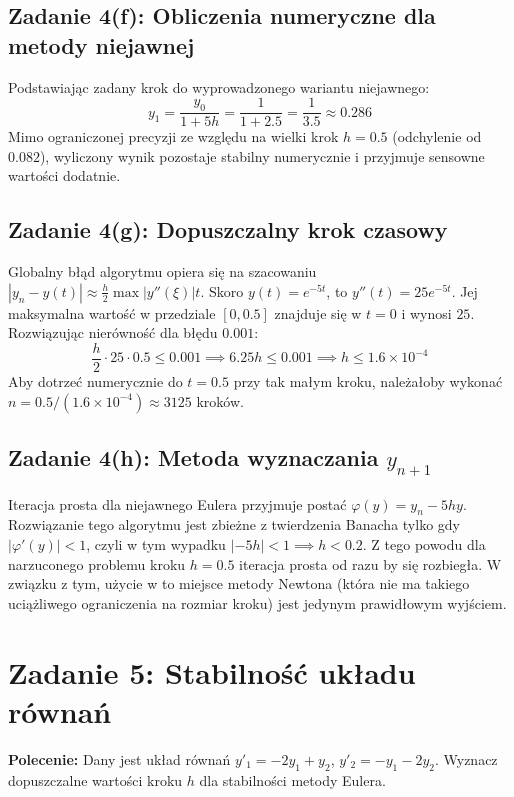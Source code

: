 \documentclass[12pt, a4paper]{article}
\begin{document}
\subsection{Zadanie 4(f): Obliczenia numeryczne dla metody niejawnej}
Podstawiając zadany krok do wyprowadzonego wariantu niejawnego:
\[
  y_1 = \frac{y_0}{1+5h} = \frac{1}{1+2.5} = \frac{1}{3.5} \approx 0.286
\]
Mimo ograniczonej precyzji ze względu na wielki krok $h=0.5$ (odchylenie od $0.082$), wyliczony wynik pozostaje stabilny numerycznie i przyjmuje sensowne wartości dodatnie.

\subsection{Zadanie 4(g): Dopuszczalny krok czasowy}
Globalny błąd algorytmu opiera się na szacowaniu $|y_n - y(t)| \approx \frac{h}{2} \max |y''(\xi)| t$. Skoro $y(t) = e^{-5t}$, to $y''(t) = 25e^{-5t}$. Jej maksymalna wartość w przedziale $[0, 0.5]$ znajduje się w $t=0$ i wynosi $25$. Rozwiązując nierówność dla błędu $0.001$:
\[
  \frac{h}{2} \cdot 25 \cdot 0.5 \leq 0.001 \implies 6.25h \leq 0.001 \implies h \leq 1.6 \times 10^{-4}
\]
Aby dotrzeć numerycznie do $t=0.5$ przy tak małym kroku, należałoby wykonać $n = 0.5 / (1.6 \times 10^{-4}) \approx 3125$ kroków.

\subsection{Zadanie 4(h): Metoda wyznaczania $y_{n+1}$}
Iteracja prosta dla niejawnego Eulera przyjmuje postać $\varphi(y) = y_n - 5hy$. Rozwiązanie tego algorytmu jest zbieżne z twierdzenia Banacha tylko gdy $|\varphi'(y)| < 1$, czyli w tym wypadku $|-5h| < 1 \implies h < 0.2$. Z tego powodu dla narzuconego problemu kroku $h=0.5$ iteracja prosta od razu by się rozbiegła. W związku z tym, użycie w to miejsce metody Newtona (która nie ma takiego uciążliwego ograniczenia na rozmiar kroku) jest jedynym prawidłowym wyjściem.

\section{Zadanie 5: Stabilność układu równań}
\textbf{Polecenie:} Dany jest układ równań $y'_1 = -2y_1 + y_2$, $y'_2 = -y_1 - 2y_2$. Wyznacz dopuszczalne wartości kroku $h$ dla stabilności metody Eulera.
\end{document}
